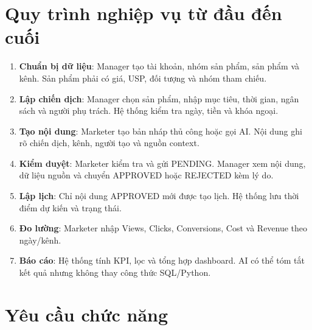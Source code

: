 \section{Quy trình nghiệp vụ từ đầu đến cuối}

\begin{enumerate}
  \item \textbf{Chuẩn bị dữ liệu}: Manager tạo tài khoản, nhóm sản phẩm, sản phẩm và kênh. Sản phẩm phải có giá, USP, đối tượng và nhóm tham chiếu.
  \item \textbf{Lập chiến dịch}: Manager chọn sản phẩm, nhập mục tiêu, thời gian, ngân sách và người phụ trách. Hệ thống kiểm tra ngày, tiền và khóa ngoại.
  \item \textbf{Tạo nội dung}: Marketer tạo bản nháp thủ công hoặc gọi AI. Nội dung ghi rõ chiến dịch, kênh, người tạo và nguồn context.
  \item \textbf{Kiểm duyệt}: Marketer kiểm tra và gửi PENDING. Manager xem nội dung, dữ liệu nguồn và chuyển APPROVED hoặc REJECTED kèm lý do.
  \item \textbf{Lập lịch}: Chỉ nội dung APPROVED mới được tạo lịch. Hệ thống lưu thời điểm dự kiến và trạng thái.
  \item \textbf{Đo lường}: Marketer nhập Views, Clicks, Conversions, Cost và Revenue theo ngày/kênh.
  \item \textbf{Báo cáo}: Hệ thống tính KPI, lọc và tổng hợp dashboard. AI có thể tóm tắt kết quả nhưng không thay công thức SQL/Python.
\end{enumerate}

\section{Yêu cầu chức năng}

